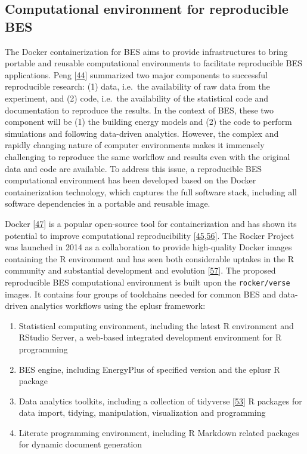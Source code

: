\documentclass[3p, times]{elsarticle} %
\providecommand{\tightlist}{%
  \setlength{\itemsep}{0pt}\setlength{\parskip}{0pt}}
\begin{document}
\hypertarget{sec:docker}{%
\subsection{Computational environment for reproducible BES}\label{sec:docker}}

The Docker containerization for BES aims to provide infrastructures to bring
portable and reusable computational environments to facilitate reproducible BES
applications. Peng {[}\protect\hyperlink{ref-Peng2015}{44}{]} summarized two major components to successful
reproducible research: (1) data, i.e.~the availability of raw data from the
experiment, and (2) code, i.e.~the availability of the statistical code and
documentation to reproduce the results. In the context of BES, these two
component will be (1) the building energy models and (2) the code to perform
simulations and following data-driven analytics. However, the complex and
rapidly changing nature of computer environments makes it immensely challenging
to reproduce the same workflow and results even with the original data and code
are available. To address this issue, a reproducible BES computational
environment has been developed based on the Docker containerization technology,
which captures the full software stack, including all software dependencies in a
portable and reusable image.

Docker {[}\protect\hyperlink{ref-Merkel2014}{47}{]} is a popular open-source tool for containerization and has
shown its potential to improve computational reproducibility {[}\protect\hyperlink{ref-Boettiger2015}{45},\protect\hyperlink{ref-Nust2020}{56}{]}. The Rocker Project was launched in 2014 as a collaboration to
provide high-quality Docker images containing the R environment and has seen
both considerable uptakes in the R community and substantial development and
evolution {[}\protect\hyperlink{ref-Boettiger2017}{57}{]}. The proposed reproducible BES computational
environment is built upon the \texttt{rocker/verse} images. It contains four groups of
toolchains needed for common BES and data-driven analytics workflows using the
eplusr framework:

\begin{enumerate}
\def\labelenumi{\arabic{enumi}.}
\tightlist
\item
  Statistical computing environment, including the latest R environment and
  RStudio Server, a web-based integrated development environment for R
  programming
\item
  BES engine, including EnergyPlus of specified version and the eplusr R
  package
\item
  Data analytics toolkits, including a collection of tidyverse {[}\protect\hyperlink{ref-Wickham2019}{53}{]}
  R packages for data import, tidying, manipulation, visualization and
  programming
\item
  Literate programming environment, including R Markdown related packages for
  dynamic document generation
\end{enumerate}
\end{document}
